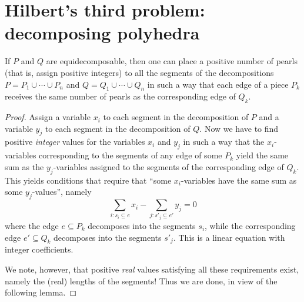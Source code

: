 \chapter{Hilbert's third problem: decomposing polyhedra}


\begin{lemma}
  \label{pearl_lemma}
  If $P$ and $Q$ are equidecomposable, then one can place
  a positive number of pearls (that is, assign positive integers) to all the
  segments of the decompositions
  $P = P_1 \cup \cdots \cup P_n$ and $Q = Q_1 \cup \cdots \cup Q_n$
  in such a way that each edge of a piece $P_k$ receives the same number of
  pearls as the corresponding edge of $Q_k$.
\end{lemma}
\begin{proof}
  Assign a variable $x_i$ to each segment in the decomposition of $P$
  and a variable $y_j$ to each segment in the decomposition of $Q$. Now we have
  to find positive \emph{integer} values for the variables $x_i$ and $y_j$ in such a way
  that the $x_i$-variables corresponding to the segments of any edge of some $P_k$
  yield the same sum as the $y_j$-variables assigned to the segments of the corresponding
  edge of $Q_k$. This yields conditions that require that ``some
  $x_i$-variables have the same sum as some $y_j$-values'', namely
\[
\sum_{i : s_i \subseteq e} x_i - \sum_{j : s'_j \subseteq e'} y_j = 0
\]
where the edge $e \subseteq P_k$ decomposes into the segments $s_i$, while the
corresponding edge $e' \subseteq Q_k$ decomposes into the segments $s'_j$. This is a linear
equation with integer coefficients.

We note, however, that positive \emph{real} values satisfying all these requirements
exist, namely the (real) lengths of the segments! Thus we are done, in view
of the following lemma.
\end{proof}

